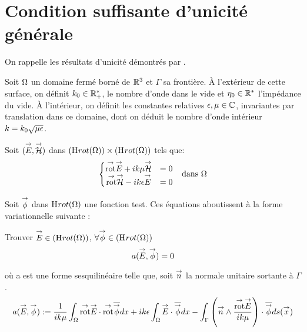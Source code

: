 \section{Condition suffisante d'unicité générale}

  On rappelle les résultats d’unicité démontrés par \cite[chapitre 2, section 11]{cessenat_mathematical_1996}.

  Soit \(\OO\) un domaine fermé borné de \(\RR^3\) et \(\Gamma\) sa frontière.
  À l'extérieur de cette surface, on définit \(k_0 \in \RR_+^*\), le nombre d'onde dans le vide et \(\eta_0 \in \RR^*\) l'impédance du vide.
  À l'intérieur, on définit les constantes relatives \(\eps,\mu \in \CC\), invariantes par translation dans ce domaine, dont on déduit le nombre d'onde intérieur \(k = k_0 \sqrt{\mu\eps}\).

  Soit \((\vE,\vH)\) dans \((\Hrot(\OO)) \times (\Hrot(\OO))\) tels que:
  \begin{align}
  \left\lbrace
    \begin{matrix}
      \trot \vE + ik \mu \vH &= 0
      \\
      \trot \vH - ik \eps \vE &= 0
    \end{matrix}
    \right. && \text{dans \(\OO\)}
  \end{align}

  Soit \(\vect{\phi}\) dans \(\Hrot(\OO)\) une fonction test. Ces équations aboutissent à la forme variationnelle suivante :
  \begin{prop}
    Trouver \(\vE \in \left(\Hrot(\OO)\right)\), \(\forall \vect \phi \in \left(\Hrot(\OO)\right)\)
    \[
      a(\vE,\vect\phi) = 0
    \]
  \end{prop}

  où a est une forme sesquilinéaire telle que, soit \(\vn\) la normale unitaire sortante à \(\Gamma\).
  \begin{align*}
    a(\vE,\vect\phi) &:=  \frac{1}{ik\mu} \int_\OO \trot \vE \cdot \trot \conj{\vect{\phi}} dx + ik\eps\int_\OO\vE\cdot\conj{\vect{\phi}} dx
      - \int_\Gamma \left(\vn \pvect \frac{\trot \vE}{ik\mu}\right) \cdot \conj{\vect \phi} ds(\vx) \\
   \end{align*}

